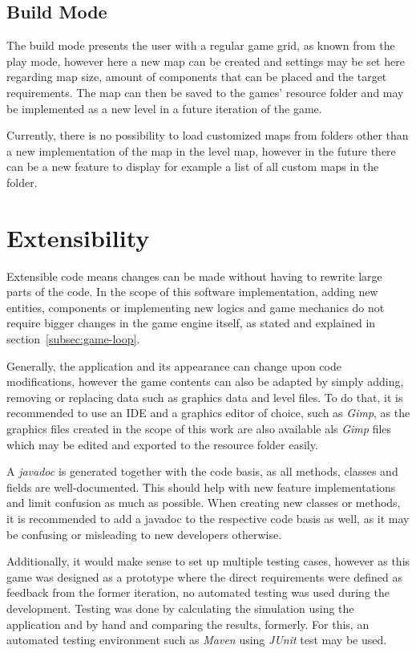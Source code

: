 \subsection{Build Mode}\label{subsec:build-mode}
The build mode presents the user with a regular game grid, as known from the play mode, however here a new
map can be created and settings may be set here regarding map size, amount of components that can be placed and
the target requirements.
The map can then be saved to the games' resource folder and may be implemented as a new level in a future iteration of the
game.

Currently, there is no possibility to load customized maps from folders other than a new implementation of the map
in the level map, however in the future there can be a new feature to display for example a list of all custom maps in the
folder.
\section{Extensibility}\label{sec:extensibility}
Extensible code means changes can be made without having to rewrite large parts of the code.
In the scope of this software implementation, adding new entities, components or implementing new logics and game mechanics
do not require bigger changes in the game engine itself, as stated and explained in section~\ref{subsec:game-loop}.

Generally, the application and its appearance can change upon code modifications, however the game contents can also
be adapted by simply adding, removing or replacing data such as graphics data and level files.
To do that, it is recommended to use an \gls{IDE} and a graphics editor of choice, such as \textit{Gimp}, as the graphics
files created in the scope of this work are also available als \textit{Gimp} files which may be edited and exported to
the resource folder easily.

A \textit{javadoc} is generated together with the code basis, as all methods, classes and fields are well-documented.
This should help with new feature implementations and limit confusion as much as possible.
When creating new classes or methods, it is recommended to add a javadoc to the respective code basis as well, as it
may be confusing or misleading to new developers otherwise.

Additionally, it would make sense to set up multiple testing cases, however as this game was designed as a prototype
where the direct requirements were defined as feedback from the former iteration, no automated testing was used during the development.
Testing was done by calculating the simulation using the application and by hand and comparing the results, formerly.
For this, an automated testing environment such as \textit{Maven} using \textit{JUnit} test may be used.

